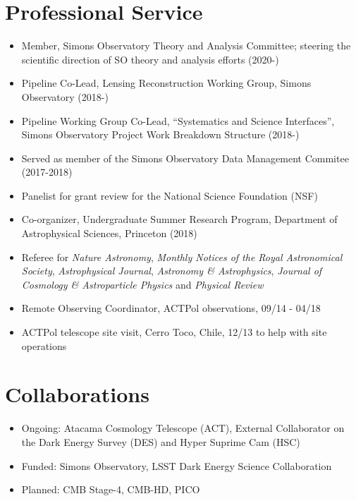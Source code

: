 \documentclass[11pt,margin]{res}
\begin{document}
\begin{resume}
\section{Professional Service}
\begin{itemize}
\item Member, Simons Observatory Theory and Analysis Committee; steering the scientific direction of SO theory and analysis efforts (2020-)
\item Pipeline Co-Lead, Lensing Reconstruction Working Group, Simons Observatory (2018-)
\item Pipeline Working Group Co-Lead, ``Systematics and Science Interfaces'', Simons Observatory Project Work Breakdown Structure (2018-)
\item Served as member of the Simons Observatory Data Management Commitee (2017-2018)
\item Panelist for grant review for the National Science Foundation (NSF)
\item Co-organizer, Undergraduate Summer Research Program, Department of Astrophysical Sciences, Princeton (2018) 
\item Referee for {\sl Nature Astronomy}, {\sl Monthly Notices of the Royal Astronomical Society}, {\sl Astrophysical Journal}, {\sl Astronomy \& Astrophysics}, {\sl Journal of Cosmology \& Astroparticle Physics}  and {\sl Physical Review}
\item Remote Observing Coordinator, ACTPol observations, 09/14 - 04/18
\item ACTPol telescope site visit, Cerro Toco, Chile, 12/13 to help with site operations
\end{itemize}

\section{Collaborations}
\begin{itemize}
\item Ongoing: Atacama Cosmology Telescope (ACT), External Collaborator on the Dark
  Energy Survey (DES) and Hyper Suprime Cam (HSC)
\item Funded: Simons Observatory, LSST Dark Energy Science Collaboration
\item Planned: CMB Stage-4, CMB-HD, PICO
\end{itemize}




\end{resume}
\end{document}
